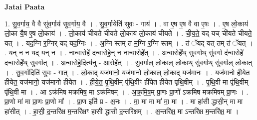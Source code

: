\documentclass[17pt]{extarticle}
\begin{document}
\textbf{Jatai Paata} \newline

1. सु॒व॒र्गाय॒ वै वै सु॑व॒र्गाय॑ सुव॒र्गाय॒ वै । . सु॒व॒र्गायेति॑ सुवः - गाय॑ । . वा ए॒ष ए॒ष वै वा ए॒षः । . ए॒ष लो॒काय॑ लो॒का यै॒ष ए॒ष लो॒काय॑ । . लो॒काय॑ चीयते चीयते लो॒काय॑ लो॒काय॑ चीयते । . ची॒य॒ते॒ यद् यच् ची॑यते चीयते॒ यत् । . यद॒ग्नि र॒ग्निर् यद् यद॒ग्निः । . अ॒ग्नि स्तम् त म॒ग्नि र॒ग्नि स्तम् । . तं ॅयद् यत् तम् तं ॅयत् । . यन् न न यद् यन् न । . नान्वा॒रोहे॑ दन्वा॒रोहे॒न् न नान्वा॒रोहे᳚त् । . अ॒न्वा॒रोहे᳚थ् सुव॒र्गाथ् सु॑व॒र्गा द॑न्वा॒रोहे॑ दन्वा॒रोहे᳚थ् सुव॒र्गात् । . अ॒न्वा॒रोहे॒दित्य॑नु - आ॒रोहे᳚त् । . सु॒व॒र्गाल् लो॒काल् लो॒काथ् सु॑व॒र्गाथ् सु॑व॒र्गाल् लो॒कात् । . सु॒व॒र्गादिति॑ सुवः - गात् । . लो॒काद् यज॑मानो॒ यज॑मानो लो॒काल् लो॒काद् यज॑मानः । . यज॑मानो हीयेत हीयेत॒ यज॑मानो॒ यज॑मानो हीयेत । . ही॒ये॒त॒ पृ॒थि॒वीम् पृ॑थि॒वीꣳ ही॑येत हीयेत पृथि॒वीम् । . पृ॒थि॒वी मा पृ॑थि॒वीम् पृ॑थि॒वी मा । . आ ऽक्र॑मिष मक्रमिष॒ मा ऽक्र॑मिषम् । . अ॒क्र॒मि॒ष॒म् प्रा॒णः प्रा॒णो᳚ ऽक्रमिष मक्रमिषम् प्रा॒णः । . प्रा॒णो मा॑ मा प्रा॒णः प्रा॒णो मा᳚ । . प्रा॒ण इति॑ प्र - अ॒नः । . मा॒ मा मा मा॑ मा॒ मा । . मा हा॑सी द्धासी॒न् मा मा हा॑सीत् । . हा॒सी॒ द॒न्तरि॑क्ष म॒न्तरि॑क्षꣳ हासी द्धासी द॒न्तरि॑क्षम् । . अ॒न्तरि॑क्ष॒ मा ऽन्तरि॑क्ष म॒न्तरि॑क्ष॒ मा । \newline
\end{document}
